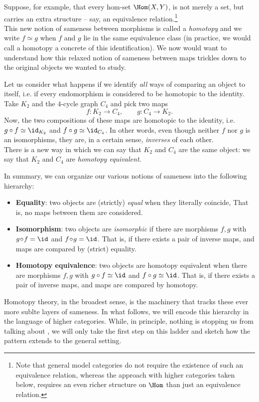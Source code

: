 \documentclass[11pt,a4paper]{article}
\begin{document}
Suppose, for example, that every hom-set $\Hom(X, Y)$, is not merely a set, but carries an extra structure -- say, an equivalence relation.\footnote{Note that general model categories do not require the existence of such an equivalence relation, whereas the approach with higher categories taken below, requires an even richer structure on $\Hom$ than just an equivalence relation.}\\
This new notion of sameness between morphisms is called a \emph{homotopy} and we write $f \simeq g$ when $f$ and $g$ lie in the same equivalence class (in practice, we would call a homotopy a concrete  of this identification). We now would want to understand how this relaxed notion of sameness between maps trickles down to the original objects we wanted to study.
\begin{example}
    Let us consider what happens if we identify \emph{all} ways of comparing an object to itself, i.e. if every endomorphism is considered to be homotopic to the identity. Take $K_2$ and the $4$-cycle graph $C_4$ and pick two maps
    \[
        f\colon K_2 \longrightarrow C_4,
        \qquad
        g\colon C_4 \longrightarrow K_2.
    \]
    Now, the two compositions of these maps are  homotopic to the identity, i.e. $g \circ f \simeq \id_{K_2}$ and $f \circ g \simeq \id_{C_4}$. In other words, even though neither $f$ nor $g$ is an isomorphisms, they are, in a certain sense, \emph{inverses} of each other. \\
    There is a new way in which we can say that $K_2$ and $C_4$ are the same object: we say that $K_2$ and $C_4$ are \emph{homotopy equivalent}.
\end{example}
In summary, we can organize our various notions of sameness into the following hierarchy: 
\begin{itemize}
    \item \textbf{Equality}: two objects are (strictly) \emph{equal} when they literally coincide, That is, no maps between them are considered.
    \item \textbf{Isomorphism}: two objects are \emph{isomorphic} if there are morphisms $f,g$ with $g\!\circ\!f=\id$ and $f\!\circ\!g=\id$. That is, if there exists a pair of inverse maps, and maps are compared by (strict) equality.
    \item \textbf{Homotopy equivalence}: two objects are homotopy equivalent when there are morphisms $f,g$ with $g \circ f\simeq\id$ and $f \circ g\simeq\id$. That is, if there exists a pair of inverse maps, and maps are compared by homotopy.
\end{itemize}
Homotopy theory, in the broadest sense, is the machinery that tracks these ever more sublte layers of sameness. In what follows, we will encode this hierarchy in the language of higher categories. While, in principle, nothing is stopping us from talking about , we will only take the first step on this ladder and sketch how the pattern extends to the general setting.
\end{document}
